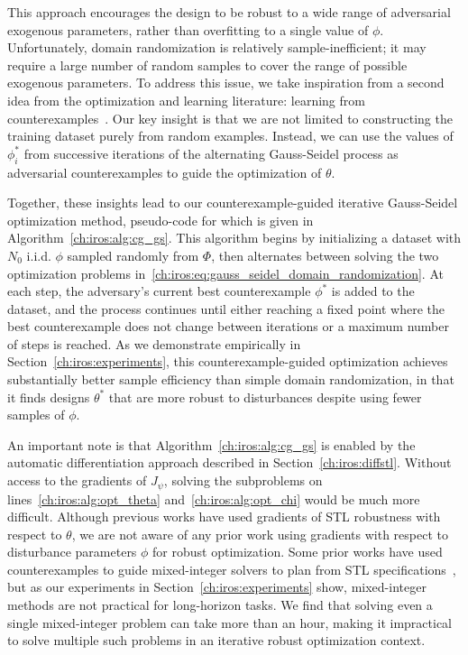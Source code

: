 This approach encourages the design to be robust to a wide range of adversarial exogenous parameters, rather than overfitting to a single value of $\phi$. Unfortunately, domain randomization is relatively sample-inefficient; it may require a large number of random samples to cover the range of possible exogenous parameters. To address this issue, we take inspiration from a second idea from the optimization and learning literature: learning from counterexamples~\cite{changNeuralLyapunovControl2019}. Our key insight is that we are not limited to constructing the training dataset purely from random examples. Instead, we can use the values of $\phi^*_i$ from successive iterations of the alternating Gauss-Seidel process as adversarial counterexamples to guide the optimization of $\theta$.

Together, these insights lead to our counterexample-guided iterative Gauss-Seidel optimization method, pseudo-code for which is given in Algorithm~\ref{ch:iros:alg:cg_gs}. This algorithm begins by initializing a dataset with $N_0$ i.i.d. $\phi$ sampled randomly from $\Phi$, then alternates between solving the two optimization problems in~\eqref{ch:iros:eq:gauss_seidel_domain_randomization}. At each step, the adversary's current best counterexample $\phi^*$ is added to the dataset, and the process continues until either reaching a fixed point where the best counterexample does not change between iterations or a maximum number of steps is reached. As we demonstrate empirically in Section~\ref{ch:iros:experiments}, this counterexample-guided optimization achieves substantially better sample efficiency than simple domain randomization, in that it finds designs $\theta^*$ that are more robust to disturbances despite using fewer samples of $\phi$.

An important note is that Algorithm~\ref{ch:iros:alg:cg_gs} is enabled by the automatic differentiation approach described in Section~\ref{ch:iros:diffstl}. Without access to the gradients of $J_\psi$, solving the subproblems on lines~\ref{ch:iros:alg:opt_theta} and~\ref{ch:iros:alg:opt_chi} would be much more difficult. Although previous works have used gradients of STL robustness with respect to $\theta$, we are not aware of any prior work using gradients with respect to disturbance parameters $\phi$ for robust optimization. Some prior works have used counterexamples to guide mixed-integer solvers to plan from STL specifications~\cite{raman15}, but as our experiments in Section~\ref{ch:iros:experiments} show, mixed-integer methods are not practical for long-horizon tasks. We find that solving even a single mixed-integer problem can take more than an hour, making it impractical to solve multiple such problems in an iterative robust optimization context.

